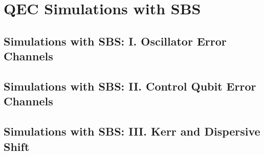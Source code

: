 \begin{figure}
    \centering
    \caption{}
    \label{fig:2_ECD_pulse_sequence}
\end{figure}

\section{QEC Simulations with SBS \label{sec:2_simulations_SBS}}

\subsection{Simulations with SBS: I. Oscillator Error Channels}

\subsection{Simulations with SBS: II. Control Qubit Error Channels}

\subsection{Simulations with SBS: III. Kerr and Dispersive Shift}

